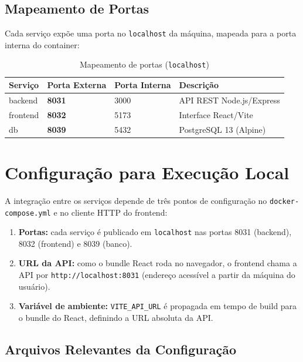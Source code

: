 \documentclass[12pt, a4paper]{article}
\newcommand{\thead}[1]{\cellcolor{tableheader}\color{white}\bfseries #1}
\newcommand{\talt}{\rowcolor{tablerowalt}}
\begin{document}
\subsection{Mapeamento de Portas}

Cada serviço expõe uma porta no \texttt{localhost} da máquina, mapeada para a porta interna do
container:

\begin{table}[H]
\centering
\begin{tabularx}{\textwidth}{|l|l|l|X|}
\hline
\thead{Serviço} & \thead{Porta Externa} & \thead{Porta Interna} & \thead{Descrição} \\
\hline
backend  & \textbf{8031} & 3000 & API REST Node.js/Express \\
\talt frontend & \textbf{8032} & 5173 & Interface React/Vite \\
db       & \textbf{8039} & 5432 & PostgreSQL 13 (Alpine) \\
\hline
\end{tabularx}
\caption{Mapeamento de portas (\texttt{localhost})}
\end{table}

\section{Configuração para Execução Local}

A integração entre os serviços depende de três pontos de configuração no \texttt{docker-compose.yml}
e no cliente HTTP do frontend:

\begin{enumerate}[leftmargin=1.5em]
  \item \textbf{Portas:} cada serviço é publicado em \texttt{localhost} nas portas 8031 (backend),
        8032 (frontend) e 8039 (banco).
  \item \textbf{URL da API:} como o bundle React roda no navegador, o frontend chama a API por
        \texttt{http://localhost:8031} (endereço acessível a partir da máquina do usuário).
  \item \textbf{Variável de ambiente:} \texttt{VITE\_API\_URL} é propagada em tempo de build para o
        bundle do React, definindo a URL absoluta da API.
\end{enumerate}

\subsection{Arquivos Relevantes da Configuração}
\end{document}
